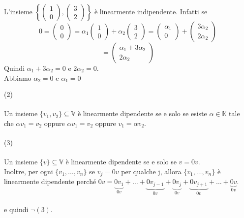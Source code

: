 \documentclass[12pt]{article}
\begin{document}
\begin{center}
    L'insieme $\left\{\begin{pmatrix}
        1\\
        0
    \end{pmatrix}, \begin{pmatrix}
        3\\
        2
    \end{pmatrix}\right\}$ è linearmente indipendente. Infatti se
    \[0 = \begin{pmatrix}
        0\\
        0
    \end{pmatrix} = \alpha_1 \begin{pmatrix}
        1\\
        0
    \end{pmatrix} + \alpha_2 \begin{pmatrix}
        3\\
        2
    \end{pmatrix} = \begin{pmatrix}
        \alpha_1\\
        0
    \end{pmatrix} + \begin{pmatrix}
        3\alpha_2\\
        2\alpha_2
    \end{pmatrix}\]
    \[= \begin{pmatrix}
        \alpha_1 + 3\alpha_2\\
        2\alpha_2
    \end{pmatrix}\]
    Quindi $\alpha_1 + 3\alpha_2 = 0$ e $2\alpha_2 = 0$.\\
    Abbiamo $\alpha_2 = 0$ e $\alpha_1 = 0$
\end{center}
(2)\\\\
Un insieme $\{v_1, v_2\} \subseteq \mathbb{V}$ è linearmente dipendente se e solo se esiste $\alpha \in \mathbb{K}$ tale che $\alpha v_1 = v_2$ oppure $\alpha v_1 = v_2$ oppure $v_1 = \alpha v_2$.\\\\
(3)\\\\
Un insieme $\{v\} \subseteq \mathbb{V}$ è linearmente dipendente se e solo se $v = 0v$.\\
Inoltre, per ogni $\{v_1, \dots, v_n\}$ se $v_j = 0v$ per qualche j, allora $\{v_1, \dots, v_n\}$ è linearmente dipendente perché $0v = \underbrace{0v_1}_{0v} + \dots + \underbrace{0v_{j-1}}_{0v} + \underbrace{0v_{j}}_{0v} + \underbrace{0v_{j+1}}_{0v} + \dots + \underbrace{0v}_{0v}$.
\\\\
e quindi $\neg (3)$.
\end{document}
